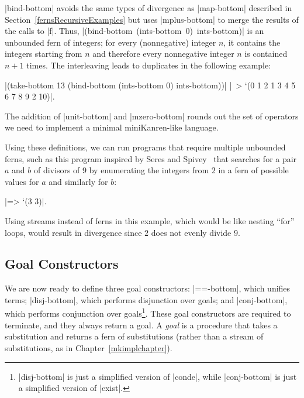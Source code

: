 \schemedisplayspace
{}


\noindent
\scheme|bind-bottom| avoids the same types of
divergence as \scheme|map-bottom| described in Section~\ref{fernsRecursiveExamples} but
uses \scheme|mplus-bottom| to merge the results of the calls to \scheme|f|.
Thus, \mbox{\scheme|(bind-bottom (ints-bottom 0) ints-bottom)|} is an unbounded fern of
integers; for every (nonnegative) integer $n$, it contains the
integers starting from $n$ and therefore every nonnegative integer $n$
is contained $n+1$ times.  The interleaving leads to
duplicates in the following example:

\wspace
\noindent\scheme|(take-bottom 13 (bind-bottom (ints-bottom 0) ints-bottom))| \schemeresult|~> `(0 1 2 1 3 4 5 6 7 8 9 2 10)|.
\wspace

\noindent
The addition of \scheme|unit-bottom| and \scheme|mzero-bottom| rounds out the set of
operators we need to implement a minimal miniKanren-like language.

\schemedisplayspace
{}

\noindent Using these definitions, we can run programs that require
multiple unbounded ferns, such as this program inspired by Seres and
Spivey~\cite{CombinatorsforLP} that searches for a pair $a$ and $b$ of
divisors of $9$ by enumerating the integers from $2$ in a fern of
possible values for $a$ and similarly for $b$:

\schemedisplayspace
\belowcodeskip 0pt
\schemeresult|=> `(3 3)|.
\belowcodeskip \medskipamount
\medskip

\noindent Using streams instead of ferns in this example, which would be
like nesting ``for'' loops, would result in divergence since $2$ does
not evenly divide $9$.

\subsection{Goal Constructors}

We are now ready to define three goal constructors:
\scheme|==-bottom|, which unifies terms; \scheme|disj-bottom|, which
performs disjunction over goals; and \scheme|conj-bottom|, which
performs conjunction over goals\footnote{\scheme|disj-bottom| is just a simplified version of \scheme|conde|, while \scheme|conj-bottom| is just a simplified version of \scheme|exist|.}. These goal constructors are required
to terminate, and they always return a goal.  A \emph{goal} is a
procedure that takes a substitution and returns a fern of
substitutions (rather than a stream of substitutions, as in
Chapter~\ref{mkimplchapter}).

